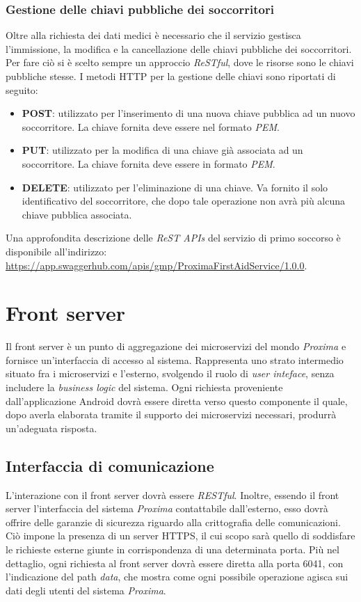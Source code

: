 \documentclass[a4paper,12pt]{report}
\begin{document}
\subsubsection*{Gestione delle chiavi pubbliche dei soccorritori}
Oltre alla richiesta dei dati medici è necessario che il servizio gestisca l'immissione, la modifica e la cancellazione delle chiavi pubbliche dei soccorritori. Per fare ciò si è scelto sempre un approccio \emph{ReSTful}, dove le risorse sono le chiavi pubbliche stesse. I metodi HTTP per la gestione delle chiavi sono riportati di seguito: 
\begin{itemize}
	\item \textbf{POST}: utilizzato per l'inserimento di una nuova chiave pubblica ad un nuovo soccorritore. La chiave fornita deve essere nel formato \emph{PEM}.
	\item \textbf{PUT}: utilizzato per la modifica di una chiave già associata ad un soccorritore. La chiave fornita deve essere in formato \emph{PEM}.
	\item \textbf{DELETE}: utilizzato per l'eliminazione di una chiave. Va fornito il solo identificativo del soccorritore, che dopo tale operazione non avrà più alcuna chiave pubblica associata. 
\end{itemize}
Una approfondita descrizione delle \emph{ReST APIs} del servizio di primo soccorso è disponibile all'indirizzo: \\ 
\url{https://app.swaggerhub.com/apis/gmp/ProximaFirstAidService/1.0.0}.

\section{Front server}
Il front server è un punto di aggregazione dei microservizi del mondo \emph{Proxima} e fornisce un'interfaccia di accesso al sistema. Rappresenta uno strato intermedio situato fra i microservizi e l'esterno, svolgendo il ruolo di \emph{user inteface}, senza includere la \emph{business logic} del sistema. Ogni richiesta proveniente dall'applicazione Android dovrà essere diretta verso questo componente il quale, dopo averla elaborata tramite il supporto dei microservizi necessari, produrrà un'adeguata risposta.

\subsection{Interfaccia di comunicazione} \label{frontserver-api}
L'interazione con il front server dovrà essere \emph{RESTful}. Inoltre, essendo il front server l'interfaccia del sistema \emph{Proxima} contattabile dall'esterno, esso dovrà offrire delle garanzie di sicurezza riguardo alla crittografia delle comunicazioni. Ciò impone la presenza di un server HTTPS, il cui scopo sarà quello di soddisfare le richieste esterne giunte in corrispondenza di una determinata porta. Più nel dettaglio, ogni richiesta al front server dovrà essere diretta alla porta 6041, con l'indicazione del path \emph{data}, che mostra come ogni possibile operazione agisca sui dati degli utenti del sistema \emph{Proxima}. 
\end{document}
